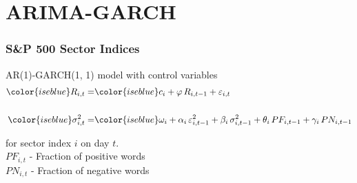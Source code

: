 \section{ARIMA-GARCH}

%    


\begin{frame}
    \frametitle{S\&P 500 Sector Indices}
    \label{stock_model}
    AR(1)-GARCH(1, 1) model with control variables
    \small
    \begin{eqnarray}\label{eq:arima}
    \color{iseblue}R_{i, t} =& \color{iseblue} c_i  + 
    \varphi \, R_{i, t-1} + 
    \varepsilon_{i,t}\label{eq:garch} \\[\baselineskip]
    \color{iseblue}
    \sigma_{i, t}^2 =& \color{iseblue}
    \omega_i +   
    \alpha_{i} \, \varepsilon_{i,t-1}^2 + 
    \beta_{i} \, \sigma_{i,t-1}^2 + 
    \theta_{i} \, PF_{i, t-1} +
    \gamma_{i} \,PN_{i, t-1}
    \vspace{10pt}
    \end{eqnarray}
    
    for sector index $i$ on day $t$. \\[\baselineskip]
     $PF_{i,t}$ - Fraction of positive words\\
     $PN_{i,t}$ - Fraction of negative words\\
\end{frame}


